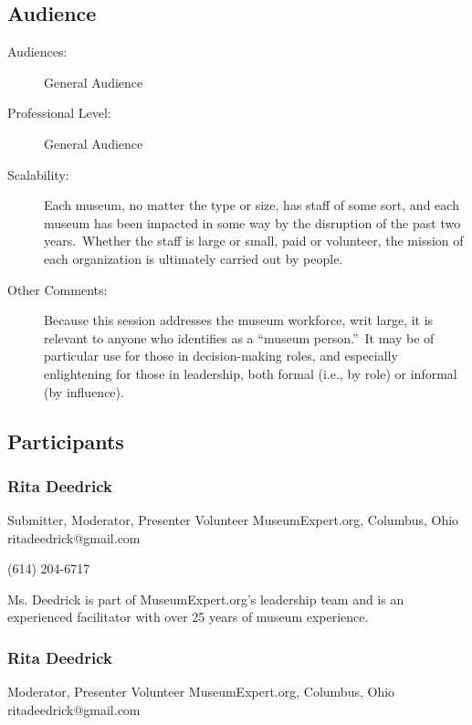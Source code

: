 \documentclass{report}
\begin{document}
              \subsection*{Audience}
                \begin{description}
                  \item [Audiences:]General Audience~
                  \item[Professional Level:]General Audience~
                \item[Scalability:] Each museum, no matter the type or size, has staff of some sort, and each museum has been impacted in some way by the disruption of the past two years. Whether the staff is large or small, paid or volunteer, the mission of each organization is ultimately carried out by people. 

							
              \item[Other Comments:] Because this session addresses the museum workforce, writ large, it is relevant to anyone who identifies as a “museum person.” It may be of particular use for those in decision-making roles, and especially enlightening for those in leadership, both formal (i.e., by role) or informal (by influence).
              \end{description}
            \subsection*{Participants}
              \subsubsection*{ Rita Deedrick }
              Submitter, Moderator, Presenter\newline
              Volunteer\newline
              MuseumExpert.org, Columbus, Ohio
              \newline
              ritadeedrick@gmail.com\newline
              
              (614) 204-6717\newline

              Ms. Deedrick is part of MuseumExpert.org’s leadership team and is an experienced facilitator with over 25 years of museum experience.\newline


              
                \subsubsection*{ Rita Deedrick }
                Moderator, Presenter\newline
                Volunteer\newline
                MuseumExpert.org, Columbus, Ohio
                \newline
                ritadeedrick@gmail.com\newline
                
\end{document}
